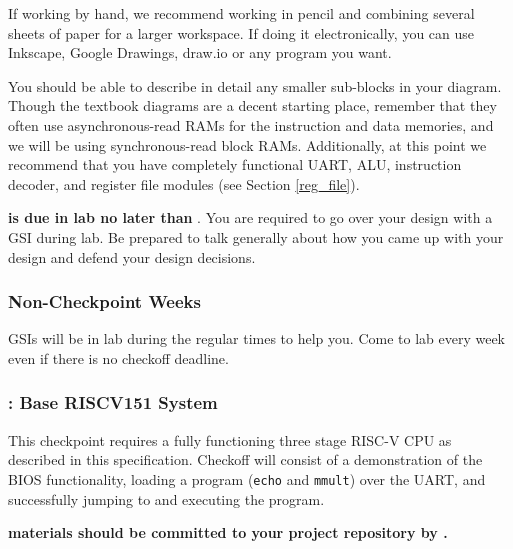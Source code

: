 \documentclass[11pt]{article}
\begin{document}
If working by hand, we recommend working in pencil and combining several sheets of paper for a larger workspace.
If doing it electronically, you can use Inkscape, Google Drawings, draw.io or any program you want.

You should be able to describe in detail any smaller sub-blocks in your diagram.
Though the textbook diagrams are a decent starting place, remember that they often use asynchronous-read RAMs for the instruction and data memories, and we will be using synchronous-read block RAMs.
Additionally, at this point we recommend that you have completely functional UART, ALU, instruction decoder, and register file modules (see Section \ref{reg_file}).

\textbf{\blockDiagramTaskName \space is due in lab no later than \blockDiagramDueDate}.
You are required to go over your design with a GSI during lab.
Be prepared to talk generally about how you came up with your design and defend your design decisions.

\subsubsection{Non-Checkpoint Weeks}
GSIs will be in lab during the regular times to help you.
Come to lab every week even if there is no checkoff deadline.

\subsubsection{\baseCPUTaskName: Base RISCV151 System}
This checkpoint requires a fully functioning three stage RISC-V CPU as described in this specification.
Checkoff will consist of a demonstration of the BIOS functionality, loading a program (\verb|echo| and \verb|mmult|) over the UART, and successfully jumping to and executing the program.

\textbf{\baseCPUTaskName \space materials should be committed to your project repository by \baseCPUDueDate.}
\end{document}

